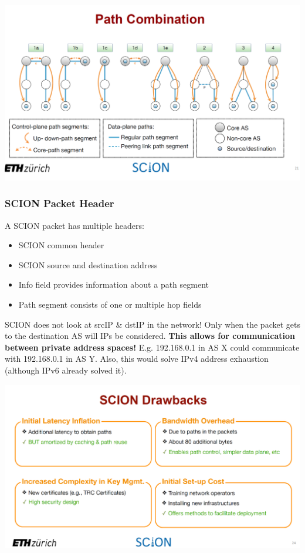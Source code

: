 \begin{minipage}{\linewidth}
    \centering      
    \includegraphics[width=\linewidth]{Figures/SCION_pathcombination.PNG} 
\end{minipage}

\subsubsection{SCION Packet Header}
A SCION packet has multiple headers:

\begin{itemize}
	\item SCION common header
	\item SCION source and destination address
	\item Info field provides information about a path segment
	\item Path segment consists of one or multiple hop fields
\end{itemize}

SCION does not look at srcIP \& dstIP in the network! Only when the packet gets to the destination AS will IPs be considered. \textbf{This allows for communication between private address spaces!} E.g. 192.168.0.1 in AS X could communicate with 192.168.0.1 in AS Y. Also, this would solve IPv4 address exhaustion (although IPv6 already solved it).

\begin{minipage}{\linewidth}
    \centering      
    \includegraphics[width=\linewidth]{Figures/SCION_drawbacks.PNG} 
\end{minipage}

